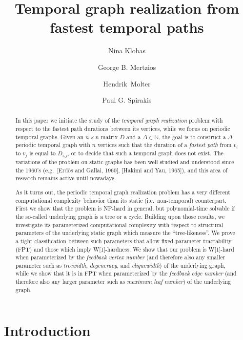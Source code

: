 \documentclass[a4paper,UKenglish,cleveref, autoref, thm-restate, anonymous]{lipics-v2021}
\title{Temporal graph realization from fastest temporal paths} %
\author{Nina Klobas}{Department of Computer Science, Durham University, UK}{nina.klobas@durham.ac.uk}{ https://orcid.org/0000-0002-8024-5782}{}
\author{George B. Mertzios}{Department of Computer Science, Durham University, UK}{george.mertzios@durham.ac.uk}{https://orcid.org/0000-0001-7182-585X}{Supported by the EPSRC grant EP/P020372/1.}
\author{Hendrik~Molter}{Department of Computer Science, Ben-Gurion~University~of~the~Negev, 
Beer-Sheva, 
Israel}{molterh@post.bgu.ac.il}{https://orcid.org/0000-0002-4590-798X}{Supported by the ISF, grant No.~1456/18, and the ERC, grant number 949707.}
\author{Paul G. Spirakis}{Department of Computer Science, University of Liverpool, UK}{p.spirakis@liverpool.ac.uk}{https://orcid.org/0000-0001-5396-3749}{Supported by the EPSRC grant EP/P02002X/1.}
\begin{document}
\maketitle

\begin{abstract}
In this paper we initiate the study of the \emph{temporal graph realization} problem with respect to the fastest path durations between its vertices, 
while we focus on periodic temporal graphs. 
Given an $n \times n$ matrix $D$ and a $\Delta \in \mathbb{N}$, the goal is to construct a $\Delta$-periodic temporal graph with $n$ vertices 
such that the duration of a \emph{fastest path} from $v_i$ to $v_j$ is equal to $D_{i,j}$, or to decide that such a temporal graph does not exist. 
The variations of the problem on static graphs has been well studied and understood since the 1960's (e.g.\ [Erd\H{o}s and Gallai, 1960], [Hakimi and Yau, 1965]), and this area of research remains active until nowadays. 

As it turns out, the periodic temporal graph realization problem has a very different computational complexity behavior than its static (i.e.~non-temporal) counterpart. 
First we show that the problem is NP-hard in general, but polynomial-time solvable if the so-called underlying graph is a tree or a cycle.
Building upon those results, we investigate its parameterized computational complexity with respect to structural parameters of the underlying static graph which measure the ``tree-likeness''. We prove a tight classification between such parameters that allow fixed-parameter tractability (FPT) 
and those which imply W[1]-hardness. 
We show that our problem is W[1]-hard when parameterized by the \emph{feedback vertex number} (and therefore also any smaller parameter such as \emph{treewidth}, \emph{degeneracy}, and \emph{cliquewidth}) of the underlying graph, while we show that it is in FPT when parameterized by the \emph{feedback edge number} (and therefore also any larger parameter such as \emph{maximum leaf number}) of the underlying graph. 





\end{abstract}



\section{Introduction}\label{intro-sec}
\end{document}
